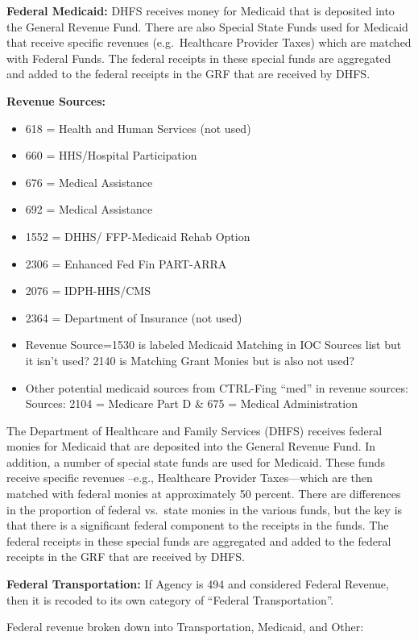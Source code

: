 \documentclass[
  letterpaper,
  DIV=11,
  numbers=noendperiod]{scrreport}
\providecommand{\tightlist}{%
  \setlength{\itemsep}{0pt}\setlength{\parskip}{0pt}}\usepackage{longtable,booktabs,array}
\begin{document}
\textbf{Federal Medicaid:} DHFS receives money for Medicaid that is
deposited into the General Revenue Fund. There are also Special State
Funds used for Medicaid that receive specific revenues (e.g.~Healthcare
Provider Taxes) which are matched with Federal Funds. The federal
receipts in these special funds are aggregated and added to the federal
receipts in the GRF that are received by DHFS.

\textbf{Revenue Sources:}

\begin{itemize}
\tightlist
\item
  618 = Health and Human Services (not used)
\item
  660 = HHS/Hospital Participation
\item
  676 = Medical Assistance
\item
  692 = Medical Assistance
\item
  1552 = DHHS/ FFP-Medicaid Rehab Option
\item
  2306 = Enhanced Fed Fin PART-ARRA
\item
  2076 = IDPH-HHS/CMS
\item
  2364 = Department of Insurance (not used)
\item
  Revenue Source=1530 is labeled Medicaid Matching in IOC Sources list
  but it isn't used? 2140 is Matching Grant Monies but is also not used?
\item
  Other potential medicaid sources from CTRL-Fing ``med'' in revenue
  sources: Sources: 2104 = Medicare Part D \& 675 = Medical
  Administration
\end{itemize}

The Department of Healthcare and Family Services (DHFS) receives federal
monies for Medicaid that are deposited into the General Revenue Fund. In
addition, a number of special state funds are used for Medicaid. These
funds receive specific revenues --e.g., Healthcare Provider
Taxes---which are then matched with federal monies at approximately 50
percent. There are differences in the proportion of federal vs.~state
monies in the various funds, but the key is that there is a significant
federal component to the receipts in the funds. The federal receipts in
these special funds are aggregated and added to the federal receipts in
the GRF that are received by DHFS.

\textbf{Federal Transportation:} If Agency is 494 and considered Federal
Revenue, then it is recoded to its own category of ``Federal
Transportation''.

Federal revenue broken down into Transportation, Medicaid, and Other:
\end{document}

